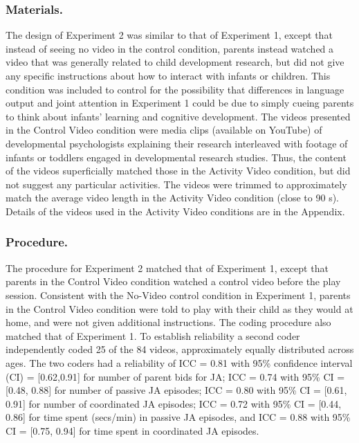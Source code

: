 \documentclass[man,floatsintext]{apa6}
\begin{document}
\hypertarget{materials.-1}{%
\subsubsection{Materials.}\label{materials.-1}}

The design of Experiment 2 was similar to that of Experiment 1, except that instead of seeing no video in the control condition, parents instead watched a video that was generally related to child development research, but did not give any specific instructions about how to interact with infants or children.
This condition was included to control for the possibility that differences in language output and joint attention in Experiment 1 could be due to simply cueing parents to think about infants' learning and cognitive development.
The videos presented in the Control Video condition were media clips (available on YouTube) of developmental psychologists explaining their research interleaved with footage of infants or toddlers engaged in developmental research studies.
Thus, the content of the videos superficially matched those in the Activity Video condition, but did not suggest any particular activities.
The videos were trimmed to approximately match the average video length in the Activity Video condition (close to 90 s).
Details of the videos used in the Activity Video conditions are in the Appendix.

\hypertarget{procedure.-1}{%
\subsubsection{Procedure.}\label{procedure.-1}}

The procedure for Experiment 2 matched that of Experiment 1, except that parents in the Control Video condition watched a control video before the play session.
Consistent with the No-Video control condition in Experiment 1, parents in the Control Video condition were told to play with their child as they would at home, and were not given additional instructions.
The coding procedure also matched that of Experiment 1.
To establish reliability a second coder independently coded 25 of the 84 videos, approximately equally distributed across ages.
The two coders had a reliability of ICC = 0.81 with 95\% confidence interval (CI) = {[}0.62,0.91{]} for number of parent bids for JA; ICC = 0.74 with 95\% CI = {[}0.48, 0.88{]} for number of passive JA episodes; ICC = 0.80 with 95\% CI = {[}0.61, 0.91{]} for number of coordinated JA episodes; ICC = 0.72 with 95\% CI = {[}0.44, 0.86{]} for time spent (secs/min) in passive JA episodes, and ICC = 0.88 with 95\% CI = {[}0.75, 0.94{]} for time spent in coordinated JA episodes.
\end{document}
